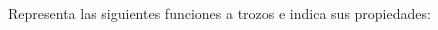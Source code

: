 \documentclass[spanish, 11pt]{exam}
\begin{document}
\begin{questions}
\question Representa las siguientes funciones a trozos e indica sus propiedades:
\begin{multicols}{2}
\begin{parts} 

\end{parts}
\end{multicols}
\end{questions}
\end{document}
